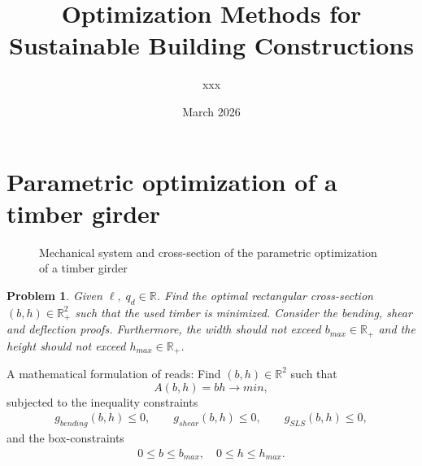 \documentclass[a4paper]{article}
\title{Optimization Methods for Sustainable Building Constructions}
\author{xxx}
\date{March 2026}
\newtheorem{problem}{Problem}
\newcommand{\R}{\mathbb{R}}
\begin{document}
\maketitle
\begin{abstract}


\end{abstract}


\tableofcontents
\clearpage
\section{Parametric optimization of a timber girder}
\begin{figure}[htb]
    \centering
    \caption{Mechanical system and cross-section of the parametric optimization of a timber girder}
    \label{fig:timber}
\end{figure}
	 \begin{problem}\label{prob:timeber}
	     Given $\ell,\; q_d\in\R$. Find the optimal rectangular cross-section $(b,h)\in \mathbb R^2_+$ such that the used timber is minimized. Consider the bending, shear and deflection proofs.
    Furthermore, the width should not exceed $b_{max}\in\R_+$ and the height should not exceed $h_{max}\in\R_+$.
\end{problem}
A mathematical formulation of  reads: Find $(b,h)\in \mathbb R^2$ such that
	\begin{equation*}
		A(b,h) = b h  \rightarrow min,
	\end{equation*}
	subjected to the inequality constraints
	\begin{align*}
		g_{bending}(b,h) \le 0, \qquad g_{shear}(b,h) \le 0, \qquad
		g_{SLS}(b,h) \le 0,
	\end{align*}
	and the box-constraints
	\begin{align*}
	0\le b \le b_{max},\quad 0\le h \le h_{max}.
	\end{align*}
\end{document}
